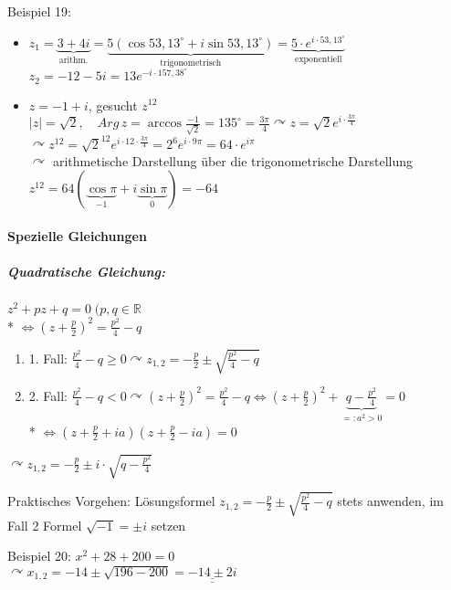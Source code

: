 \documentclass[a4paper]{scrartcl}
\begin{document}
Beispiel 19:
\begin{itemize}
\item $z_1 = \underbrace{3+4i}_{\text{arithm.}} = \underbrace{5(\cos{53,13^\circ} + i\sin{53,13^\circ})}_{\text{trigonometrisch}} = \underbrace{5 \cdot e^{i \cdot 53,13^\circ}}_{\text{exponentiell}}$\\
$z_2 = -12 -5i = 13 e^{-i \cdot 157,38^\circ}$
\item $z=-1+i$, gesucht $z^{12}$\\
$\lvert z \rvert = \sqrt{2}, \quad Arg\, z = \arccos{\frac{-1}{\sqrt{2}}} = 135^\circ = \frac{3\pi}{4} \curvearrowright z= \sqrt{2} e^{i \cdot \frac{3\pi}{4}}$\\
$\curvearrowright z^{12} = \sqrt{2}^{12} e ^{i\cdot 12 \cdot \frac{3\pi}{4}} = 2^6 e^{i \cdot 9 \pi} = 64 \cdot e^{i\pi}$\\
$\curvearrowright$ arithmetische Darstellung über die trigonometrische Darstellung\\
$z^{12} = 64 (\underbrace{\cos{\pi}}_{-1} + i \underbrace{\sin{\pi}}_{0}) = -64$
\end{itemize}
\paragraph{Spezielle Gleichungen}
\subparagraph{Quadratische Gleichung:} $z^2 + pz +q = 0 \; (p,q\in \mathbb{R}$\\*
$\Leftrightarrow (z+ \frac{p}{2})^2 = \frac{p^2}{4} - q$
\begin{enumerate}
\item 1. Fall: $\frac{p^2}{4} -q \geq 0 \curvearrowright z_{1,2} = -\frac{p}{2} \pm \sqrt{\frac{p^2}{4} -q }$
\item 2. Fall: $\frac{p^2}{4} -q < 0 \curvearrowright (z+ \frac{p}{2})^2 = \frac{p^2}{4} - q \Leftrightarrow (z +\frac{p}{2})^2 + \underbrace{q - \frac{p^2}{4}}_{=:a^2>0} = 0$\\*
$\Leftrightarrow (z+\frac{p}{2} + ia) ( z+ \frac{p}{2} -ia) = 0$
\end{enumerate}
$\curvearrowright z_{1,2} = -\frac{p}{2} \pm i \cdot \sqrt{q - \frac{p^2}{4}}$

Praktisches Vorgehen: Lösungsformel $z_{1,2} = -\frac{p}{2} \pm \sqrt{\frac{p^2}{4} -q }$ stets anwenden, im Fall 2 Formel $\sqrt{-1} = \pm i$ setzen

Beispiel 20: $x^2 + 28 +200 = 0$\\
$\curvearrowright x_{1,2} = -14 \pm \sqrt{196-200} = \underline{\underline{-14 \pm 2i}}$
\end{document}

